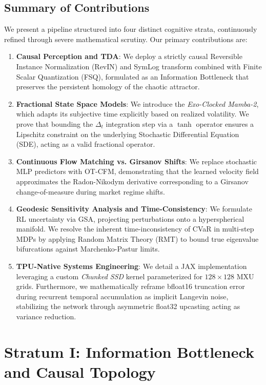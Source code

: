 \documentclass[11pt]{article}
\begin{document}
\subsection{Summary of Contributions}
We present a pipeline structured into four distinct cognitive strata, continuously refined through severe mathematical scrutiny. Our primary contributions are:
\begin{enumerate}
    \item \textbf{Causal Perception and TDA}: We deploy a strictly causal Reversible Instance Normalization (RevIN) and SymLog transform combined with Finite Scalar Quantization (FSQ), formulated as an Information Bottleneck that preserves the persistent homology of the chaotic attractor.
    \item \textbf{Fractional State Space Models}: We introduce the \textit{Exo-Clocked Mamba-2}, which adapts its subjective time explicitly based on realized volatility. We prove that bounding the $\Delta_t$ integration step via a $\tanh$ operator ensures a Lipschitz constraint on the underlying Stochastic Differential Equation (SDE), acting as a valid fractional operator.
    \item \textbf{Continuous Flow Matching vs. Girsanov Shifts}: We replace stochastic MLP predictors with OT-CFM, demonstrating that the learned velocity field approximates the Radon-Nikodym derivative corresponding to a Girsanov change-of-measure during market regime shifts.
    \item \textbf{Geodesic Sensitivity Analysis and Time-Consistency}: We formulate RL uncertainty via GSA, projecting perturbations onto a hyperspherical manifold. We resolve the inherent time-inconsistency of CVaR in multi-step MDPs by applying Random Matrix Theory (RMT) to bound true eigenvalue bifurcations against Marchenko-Pastur limits.
    \item \textbf{TPU-Native Systems Engineering}: We detail a JAX implementation leveraging a custom \textit{Chunked SSD} kernel parameterized for $128 \times 128$ MXU grids. Furthermore, we mathematically reframe bfloat16 truncation error during recurrent temporal accumulation as implicit Langevin noise, stabilizing the network through asymmetric float32 upcasting acting as variance reduction.
\end{enumerate}

\section{Stratum I: Information Bottleneck and Causal Topology}
\label{sec:stratum_i}
\end{document}
